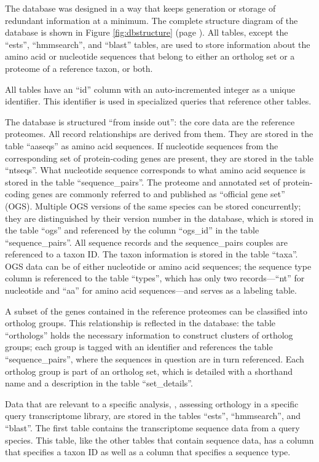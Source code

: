 \label{sec:database-structure}
The database was designed in a way that keeps
generation or storage of redundant information at a minimum. The complete
structure diagram of the database is shown in Figure \ref{fig:dbstructure} (page
\pageref{fig:dbstructure}). All tables, except the ``ests'', ``hmmsearch'', and
``blast'' tables, are used to store information about the amino acid or
nucleotide sequences that belong to either an ortholog set or a proteome of a
reference taxon, or both. 

All tables have an ``id'' column with an auto-incremented integer as a unique
identifier. This identifier is used in specialized queries that reference other
tables. 

The database is structured ``from inside out'': the core data are the reference
proteomes. All record relationships are derived from them. They are stored in
the table ``aaseqs'' as amino acid sequences. If nucleotide sequences from the
corresponding set of protein-coding genes are present, they are stored in the
table ``ntseqs''. What nucleotide sequence corresponds to what amino acid
sequence is stored in the table ``sequence\_pairs''. The proteome and annotated
set of protein-coding genes are commonly referred to and published as ``official
gene set'' (OGS).  Multiple OGS versions of
the same species can be stored concurrently; they are distinguished by their
version number in the database, which is stored in the table ``ogs'' and
referenced by the column ``ogs\_id'' in the table ``sequence\_pairs''.  All
sequence records and the sequence\_pairs couples are referenced to a taxon
ID. The taxon information is stored in the table
``taxa''.  OGS data can be of either nucleotide or amino acid sequences; the
sequence type column is referenced to the table ``types'', which has only two
records---``nt'' for nucleotide and ``aa'' for amino acid sequences---and serves
as a labeling table.

A subset of the genes contained in the reference proteomes can be classified
into ortholog groups. This relationship is reflected in the database: the table
``orthologs'' holds the necessary information to construct clusters of ortholog
groups; each group is tagged with an identifier and references the table
``sequence\_pairs'', where the sequences in question are in turn referenced.
Each ortholog group is part of an ortholog set, which is detailed with a
shorthand name and a description in the table ``set\_details''.

Data that are relevant to a specific analysis, \eg, assessing orthology in a
specific query transcriptome library, are stored in the tables ``ests'',
``hmmsearch'', and ``blast''.  The first table contains the transcriptome
sequence data from a query species.  This table, like the other tables that
contain sequence data, has a column that specifies a taxon ID as well as a
column that specifies a sequence type.

